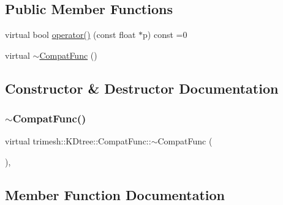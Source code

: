 \subsection*{Public Member Functions}
\begin{DoxyCompactItemize}
\item 
virtual bool \hyperlink{structtrimesh_1_1KDtree_1_1CompatFunc_a7a1e53ff346e21daac1bf003a21d2170}{operator()} (const float $\ast$p) const =0
\item 
virtual \hyperlink{structtrimesh_1_1KDtree_1_1CompatFunc_a6ae6120ac95abcc5322f6b25569e550d}{$\sim$\+Compat\+Func} ()
\end{DoxyCompactItemize}


\subsection{Constructor \& Destructor Documentation}
\mbox{\label{structtrimesh_1_1KDtree_1_1CompatFunc_a6ae6120ac95abcc5322f6b25569e550d}} 
\subsubsection{\texorpdfstring{$\sim$\+Compat\+Func()}{~CompatFunc()}}
{\footnotesize\ttfamily virtual trimesh\+::\+K\+Dtree\+::\+Compat\+Func\+::$\sim$\+Compat\+Func (\begin{DoxyParamCaption}{ }\end{DoxyParamCaption})\hspace{0.3cm}{\ttfamily [inline]}, {\ttfamily [virtual]}}



\subsection{Member Function Documentation}
\mbox{\label{structtrimesh_1_1KDtree_1_1CompatFunc_a7a1e53ff346e21daac1bf003a21d2170}} 

